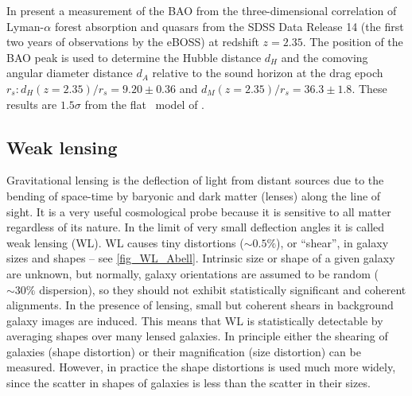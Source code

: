In \textcite{BAO_results} present a measurement of the BAO from the three-dimensional correlation of Lyman-$\alpha$ forest absorption and quasars from the SDSS Data Release 14 (the first two years of observations by the eBOSS) at redshift $z=2.35$. The position of the BAO peak is used to determine the Hubble distance $d_H$ and the comoving angular diameter distance $d_A$ relative to the sound horizon at the drag epoch $r_s: d_H(z=2.35)/r_s = 9.20\pm0.36$ and $d_M(z=2.35)/r_s = 36.3\pm1.8$. These results are $1.5\sigma$ from the flat \LCDM\ model of \textcite{2016A&A...594A..13P}.
\subsection{Weak lensing}
Gravitational lensing is the deflection of light from distant sources due to the bending of space-time by baryonic and dark matter (lenses) along the line of sight. It is a very useful cosmological probe because it is sensitive to all matter regardless of its nature. In the limit of very small deflection angles it is called weak lensing (WL). WL causes tiny distortions ($\sim0.5\%$), or ``shear'', in galaxy sizes and shapes -- see \autoref{fig_WL_Abell}. Intrinsic size or shape of a given galaxy are unknown, but normally, galaxy orientations are assumed to be random ($\sim30\%$ dispersion), so they should not exhibit statistically significant and coherent alignments. In the presence of lensing, small but coherent shears in background galaxy images are induced. This means that WL is statistically detectable by averaging shapes over many lensed galaxies. In principle either the shearing of galaxies (shape distortion) or their magnification (size distortion) can be measured. However, in practice the shape distortions is used much more widely, since the scatter in shapes of galaxies is less than the scatter in their sizes.

